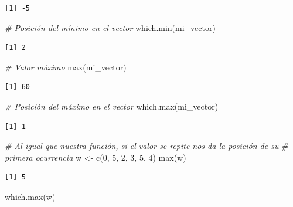\documentclass[
]{book}
\newenvironment{Shaded}{\begin{snugshade}}{\end{snugshade}}
\newcommand{\CommentTok}[1]{\textcolor[rgb]{0.56,0.35,0.01}{\textit{#1}}}
\newcommand{\DecValTok}[1]{\textcolor[rgb]{0.00,0.00,0.81}{#1}}
\newcommand{\FunctionTok}[1]{\textcolor[rgb]{0.00,0.00,0.00}{#1}}
\newcommand{\NormalTok}[1]{#1}
\newcommand{\OtherTok}[1]{\textcolor[rgb]{0.56,0.35,0.01}{#1}}
\begin{document}
\begin{itemize}
\begin{verbatim}
[1] -5
\end{verbatim}

\begin{Shaded}
\begin{Highlighting}[]
\CommentTok{\# Posición del mínimo en el vector}
\FunctionTok{which.min}\NormalTok{(mi\_vector)}
\end{Highlighting}
\end{Shaded}

\begin{verbatim}
[1] 2
\end{verbatim}

\begin{Shaded}
\begin{Highlighting}[]
\CommentTok{\# Valor máximo}
\FunctionTok{max}\NormalTok{(mi\_vector)}
\end{Highlighting}
\end{Shaded}

\begin{verbatim}
[1] 60
\end{verbatim}

\begin{Shaded}
\begin{Highlighting}[]
\CommentTok{\# Posición del máximo en el vector}
\FunctionTok{which.max}\NormalTok{(mi\_vector)}
\end{Highlighting}
\end{Shaded}

\begin{verbatim}
[1] 1
\end{verbatim}

\begin{Shaded}
\begin{Highlighting}[]
\CommentTok{\# Al igual que nuestra función, si el valor se repite nos da la posición de su}
\CommentTok{\# primera ocurrencia}
\NormalTok{w }\OtherTok{\textless{}{-}} \FunctionTok{c}\NormalTok{(}\DecValTok{0}\NormalTok{, }\DecValTok{5}\NormalTok{, }\DecValTok{2}\NormalTok{, }\DecValTok{3}\NormalTok{, }\DecValTok{5}\NormalTok{, }\DecValTok{4}\NormalTok{)}
\FunctionTok{max}\NormalTok{(w)}
\end{Highlighting}
\end{Shaded}

\begin{verbatim}
[1] 5
\end{verbatim}

\begin{Shaded}
\begin{Highlighting}[]
\FunctionTok{which.max}\NormalTok{(w)}
\end{Highlighting}
\end{Shaded}


\end{itemize}
\end{document}
